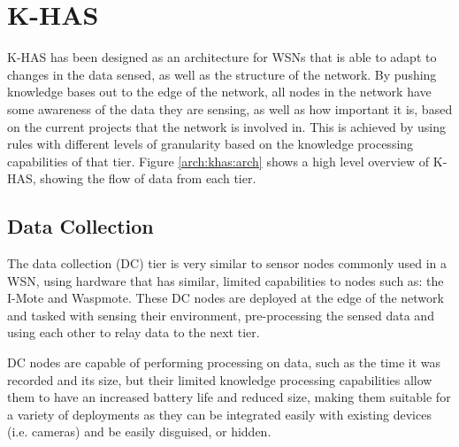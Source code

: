 	\section{K-HAS}\label{arch:khas}
		K-HAS has been designed as an architecture for WSNs that is able to adapt to changes in the data sensed, as well as the structure of the network. By pushing knowledge bases out to the edge of the network, all nodes in the network have some awareness of the data they are sensing, as well as how important it is, based on the current projects that the network is involved in. This is achieved by using rules with different levels of granularity based on the knowledge processing capabilities of that tier. Figure \ref{arch:khas:arch} shows a high level overview of K-HAS, showing the flow of data from each tier.
	
	
	\subsection{Data Collection}\label{khas:dc}
	The data collection (DC) tier is very similar to sensor nodes commonly used in a WSN, using hardware that has similar, limited capabilities to nodes such as: the I-Mote and Waspmote. These DC nodes are deployed at the edge of the network and tasked with sensing their environment, pre-processing the sensed data and using each other to relay data to the next tier.

	DC nodes are capable of performing processing on data, such as the time it was recorded and its size, but their limited knowledge processing capabilities allow them to have an increased battery life and reduced size, making them suitable for a variety of deployments as they can be integrated easily with existing devices (i.e. cameras) and be easily disguised, or hidden.
